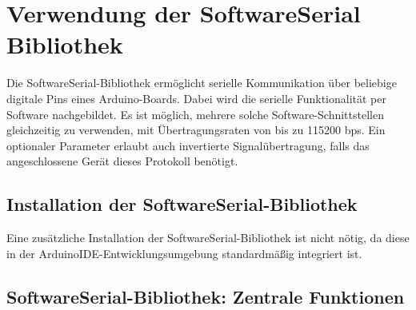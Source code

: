 \begin{center}
	\label{Code:Beispielcode für die RemoteXY-Bibliothek}
\end{center}

\section{Verwendung der SoftwareSerial Bibliothek}


	Die SoftwareSerial-Bibliothek ermöglicht serielle Kommunikation über beliebige digitale Pins eines Arduino-Boards. Dabei wird die serielle Funktionalität per Software nachgebildet.
	Es ist möglich, mehrere solche Software-Schnittstellen gleichzeitig zu verwenden, mit Übertragungsraten von bis zu 115200 bps.
	Ein optionaler Parameter erlaubt auch invertierte Signalübertragung, falls das angeschlossene Gerät dieses Protokoll benötigt. \cite{Arduino:2022SoftwareSerial}

\subsection{Installation der SoftwareSerial-Bibliothek}

Eine zusätzliche Installation der SoftwareSerial-Bibliothek ist nicht nötig, da diese in der ArduinoIDE-Entwicklungsumgebung standardmäßig integriert ist.

\subsection{SoftwareSerial-Bibliothek: Zentrale Funktionen}

